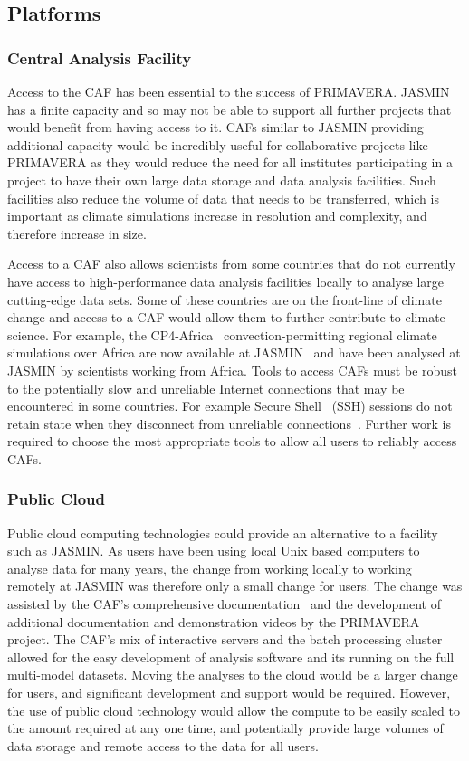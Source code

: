 \documentclass[gmd, manuscript]{copernicus}
\begin{document}
\subsection{Platforms}

\subsubsection{Central Analysis Facility}
Access to the CAF has been essential to the success of PRIMAVERA. JASMIN has a finite capacity and so may not be able to support all further projects that would benefit from having access to it. CAFs similar to JASMIN providing additional capacity would be incredibly useful for collaborative projects like PRIMAVERA as they would reduce the need for all institutes participating in a project to have their own large data storage and data analysis facilities. Such facilities also reduce the volume of data that needs to be transferred, which is important as climate simulations increase in resolution and complexity, and therefore increase in size.

Access to a CAF also allows scientists from some countries that do not currently have access to high-performance data analysis facilities locally to analyse large cutting-edge data sets. Some of these countries are on the front-line of climate change and access to a CAF would allow them to further contribute to climate science. For example, the CP4-Africa~\citep{Stratton2018} convection-permitting regional climate simulations over Africa are now available at JASMIN~\citep{Senior2019} and have been analysed at JASMIN by scientists working from Africa. Tools to access CAFs must be robust to the potentially slow and unreliable Internet connections that may be encountered in some countries. For example Secure Shell~\citep{ssh} (SSH) sessions do not retain state when they disconnect from unreliable connections~\citep{senior_catherine_2020_4316467}. Further work is required to choose the most appropriate tools to allow all users to reliably access CAFs. 

\subsubsection{Public Cloud}
Public cloud computing technologies could provide an alternative to a facility such as JASMIN. As users have been using local Unix based computers to analyse data for many years, the change from working locally to working remotely at JASMIN was therefore only a small change for users. The change was assisted by the CAF's comprehensive documentation~\citep{JASMINdocs} and the development of additional documentation and demonstration videos by the PRIMAVERA project. The CAF's mix of interactive servers and the batch processing cluster allowed for the easy development of analysis software and its running on the full multi-model datasets. Moving the analyses to the cloud would be a larger change for users, and significant development and support would be required. However, the use of public cloud technology would allow the compute to be easily scaled to the amount required at any one time, and potentially provide large volumes of data storage and remote access to the data for all users.
\end{document}
